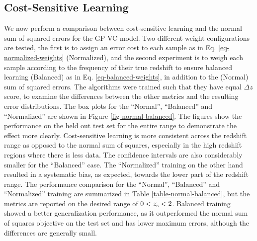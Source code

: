 \documentclass[useAMS,usenatbib,fleqn]{mn2e}
\begin{document}
\subsection{Cost-Sensitive Learning}

We now perform a comparison between cost-sensitive learning and the normal sum of squared errors for the GP-VC model. Two different weight configurations are tested, the first is to assign an error cost to each sample as in Eq. \eqref{eq-normalized-weights} (Normalized), and the second experiment is to weigh each sample according to the frequency of their true redshift to ensure balanced learning (Balanced) as in Eq. \eqref{eq-balanced-weights}, in addition to the (Normal) sum of squared errors. The algorithms were trained such that they have equal $\Delta z$ score, to examine the differences between the other metrics and the resulting error distributions. The box plots  for the ``Normal'', ``Balanced'' and ``Normalized'' are shown in Figure \ref{fig-normal-balanced}. The figures show the performance on the held out test set for the entire range to demonstrate the effect more clearly. Cost-sensitive learning is more consistent across the redshift range as opposed to the normal sum of squares, especially in the high redshift regions where there is less data. The confidence intervals are also considerably smaller for the ``Balanced'' case. The ``Normalized'' training on the other hand resulted in a systematic bias, as expected, towards the lower part of the redshift range. The performance comparison for the ``Normal'', ``Balanced'' and ``Normalized'' training are summarized in Table \ref{table-normal-balanced}, but the metrics are reported on the desired range of $0<z_{\rm s}<2$. Balanced training showed a better generalization performance, as it outperformed the normal sum of squares objective on the test set and has lower maximum errors, although the differences are generally small.
\end{document}
